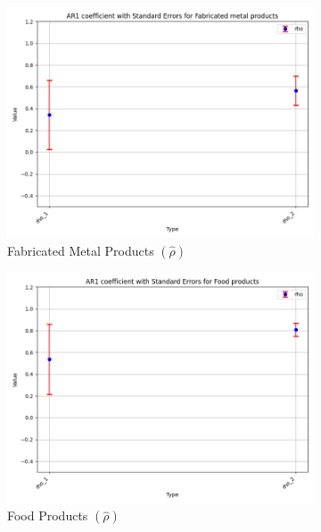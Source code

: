 \documentclass{article}
\begin{document}
\begin{figure}[ht!]
    \begin{subfigure}[t]{0.32\textwidth}
        \centering
        \includegraphics[width=\textwidth]{figure/empirical_ar1_mixture_rho_with_error_bars_Fabricated metal products.png}
        \caption{Fabricated Metal Products $(\hat\rho)$}
    \end{subfigure}
    \begin{subfigure}[t]{0.32\textwidth}
        \centering
        \includegraphics[width=\textwidth]{figure/empirical_ar1_mixture_rho_with_error_bars_Food products.png}
        \caption{Food Products  $(\hat\rho)$}
    \end{subfigure}
    \begin{subfigure}[t]{0.32\textwidth}

\end{subfigure}
\end{figure}
\end{document}
